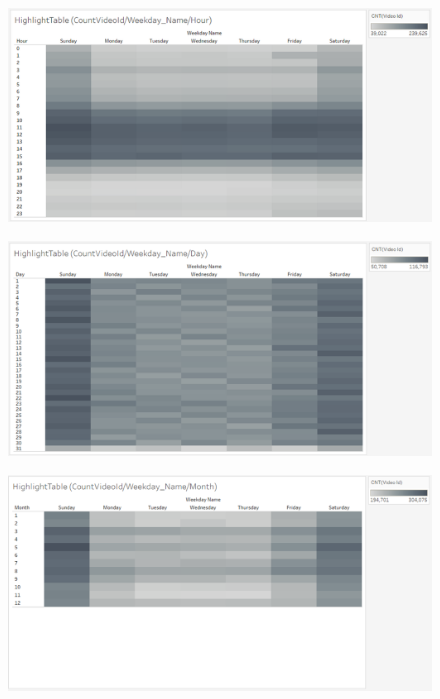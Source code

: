 \documentclass[submit,techrep,noauthor]{ipsj}
\begin{document}
\begin{figure}[h]
  \begin{minipage}[b]{0.49\columnwidth}
    \centering
    \hspace{-1.0zh}
    \includegraphics[width=\columnwidth]{./eps/HighlightTable_CountVideoId_WeekdayNameHour.eps}
    \label{fig:highlighttable_countvideoid_weekday_hour}
  \end{minipage}
  \begin{minipage}[b]{0.49\columnwidth}
    \centering
    \includegraphics[width=\columnwidth]{./eps/HighlightTable_CountVideoId_WeekdayNameDay.eps}
    \label{fig:highlighttable_countvideoid_weekday_day}
  \end{minipage}
  \begin{minipage}[b]{0.49\columnwidth}
    \centering
    \includegraphics[width=\columnwidth]{./eps/HighlightTable_CountVideoId_WeekdayNameMonth.eps}

\end{minipage}
\end{figure}
\end{document}
